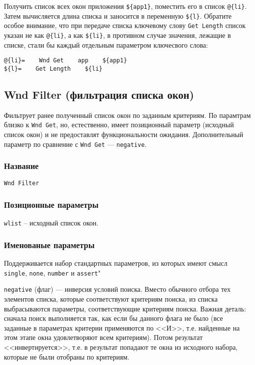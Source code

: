 \documentclass[11pt]{book} %
\begin{document}
Получить список всех окон приложения \verb"${app1}", поместить его в список \verb"@{li}". Затем вычисляется длина списка и заносится в переменную \verb"${l}". Обратите особое внимание, что при передаче списка ключевому слову \verb"Get Length" список указан не как \verb"@{li}", а как \verb"${li}", в противном случае значения, лежащие в списке, стали бы каждый отдельным параметром ключесвого слова:
\begin{verbatim}
@{li}=    Wnd Get    app    ${app1}
${l}=    Get Length    ${li}
\end{verbatim}



\subsection{Wnd Filter (фильтрация списка окон)}
Фильтрует ранее полученный список окон по заданным критериям. По парамтрам близко к \verb"Wnd Get", но, естественно, имеет позиционный параметр (исходный список окон) и не предоставлят функциональности ожидания. Дополнительный параметр по сравнение с \verb"Wnd Get" --- \verb"negative".

\subsubsection*{Название}
\verb"Wnd Filter"

\subsubsection*{Позиционные параметры} 

\verb"wlist" -- исходный список окон.

\subsubsection*{Именованые параметры} 

Поддерживается набор стандартных параметров, из которых имеют смысл \verb"single", \verb|none|, \verb|number| и \verb"assert""


\verb"negative" (флаг) --- инверсия условий поиска. Вместо обычного отбора тех элементов списка, которые соответствуют критериям поиска, из списка выбрасываются параметры, соответствующие критериям поиска. Важная деталь: сначала поиск выполняется так, как если бы данного флага не было (все заданные в параметрах критерии применяются по <<И>>, т.е. найденные на этом этапе окна удовлетворяют всем критериям). Потом результат <<инвертируется>>, т.е. в результат попадают те окна из исходного набора, которые не были отобраны по критериям.
\end{document}
